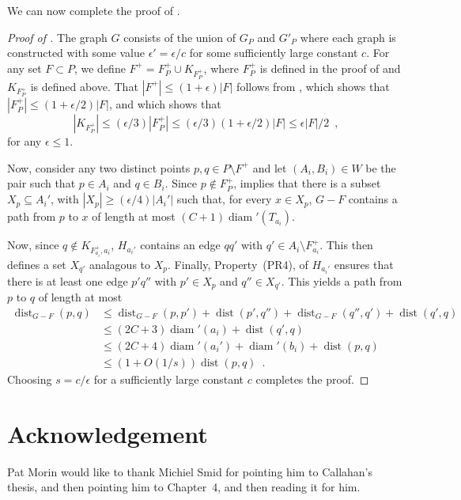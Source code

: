 \documentclass{patmorin}
\DeclareMathOperator{\diam}{diam}
\DeclareMathOperator{\dist}{dist}
\begin{document}
We can now complete the proof of .

\begin{proof}[Proof of ]
  The graph $G$ consists of the union of $G_P$ and $G'_P$ where each
  graph is constructed with some value $\epsilon' = \epsilon/c$ for
  some sufficiently large constant $c$.  For any set $F\subset P$, we
  define $F^+ = F^+_P \cup K_{F^+_P}$, where $F^+_P$ is defined in the
  proof of  and $K_{F^+_P}$ is defined above.  
  That $|F^+| \le (1+\epsilon)|F|$
  follows from , which shows that $|F^+_P|\le
  (1+\epsilon/2)|F|$, and  which shows that 
  \[
     |K_{F^+_P}|\le (\epsilon/3)|F^+_P|\le (\epsilon/3)(1+\epsilon/2)|F|
     \le \epsilon|F|/2 \enspace ,
  \]
  for any $\epsilon \le 1$.

  Now, consider any two distinct points $p,q\in P\setminus F^+$ and
  let $(A_i,B_i)\in W$ be the pair such that $p\in A_i$ and $q\in B_i$.
  Since $p\not\in F^+_P$,  implies that there is a
  subset $X_{p}\subseteq A_i'$, with $|X_{p}|\ge (\epsilon/4)|A_i'|$
  such that, for every $x\in X_{p}$, $G-F$ contains a path from $p$
  to $x$ of length at most $(C+1)\diam'(T_{a_i})$.
  
  Now, since $q\not\in K_{F^+_{a_i},a_i}$, $H_{a_i'}$ contains an edge
  $qq'$ with $q'\in A_i\setminus F^+_{a_i}$.  This then defines a set
  $X_{q'}$ analagous to $X_{p}$.  Finally, Property~(PR4), of $H_{a_i'}$
  ensures that there is at least one edge $p'q''$ with $p'\in X_{p}$
  and $q''\in X_{q'}$.  This yields a path from $p$ to $q$ of length at most
  \begin{align*}
    \dist_{G-F}(p,q) & \le \dist_{G-F}(p,p') + \dist(p',q'') + \dist_{G-F}(q'',q') + \dist(q',q) \\
      & \le (2C+3)\diam'(a_i) + \dist(q',q) \\
      & \le (2C+4)\diam'(a_i') + \diam'(b_i) + \dist(p,q) \\
      & \le (1+O(1/s))\dist(p,q) \enspace . 
  \end{align*}
  Choosing $s = c/\epsilon$ for a sufficiently large constant $c$
  completes the proof.
\end{proof}

\section*{Acknowledgement}

Pat Morin would like to thank Michiel Smid for pointing him to Callahan's thesis, and then pointing him to Chapter~4, and then reading it for him.




\end{document}
